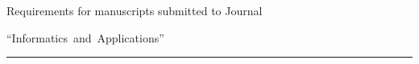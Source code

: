 \def\stat{podg-e}


{%




\vspace*{-24pt}


\raggedleft\Large \bf%


Requirements for manuscripts submitted to Journal


``Informatics~and~Applications'' \vskip 8pt


    \hrule


    \par


 }





\label{st\stat}





\def\tit{\ }





\def\aut{\ }


\def\auf{\ }





\def\leftkol{\ }





\def\rightkol{\ }









\titele{\tit}{\aut}{\auf}{\leftkol}{\rightkol}





\def\leftfootline{\small{\textbf{\thepage}


\hfill INFORMATIKA I EE PRIMENENIYA~--- INFORMATICS AND APPLICATIONS\ \ \ 2024\


\ \ volume~18\ \ \ issue\ 3}


}%


 \def\rightfootline{\small{INFORMATIKA I EE PRIMENENIYA~--- INFORMATICS AND APPLICATIONS\ \ \ 2024\ \ \ volume~18\ \ \ issue\ 3


\hfill \textbf{\thepage}}}





